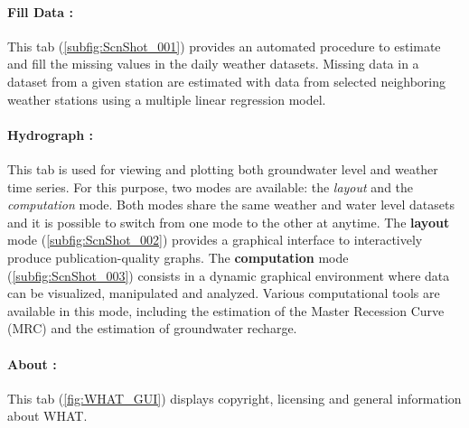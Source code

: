 \documentclass[WHATMANUAL.tex]{subfiles}
\begin{document}
\paragraph{Fill Data :} This tab (\cref{subfig:ScnShot_001}) provides an automated procedure to estimate and fill the missing values in the daily weather datasets. Missing data in a dataset from a given station are estimated with data from selected neighboring weather stations using a multiple linear regression model.

\paragraph{Hydrograph :} This tab is used for viewing and plotting both groundwater level and weather time series. For this purpose, two modes are available: the \emph{layout} and the \emph{computation} mode. Both modes share the same weather and water level datasets and it is possible to switch from one mode to the other at anytime. The \textbf{layout} mode (\cref{subfig:ScnShot_002}) provides a graphical interface to interactively produce publication-quality graphs. The \textbf{computation} mode (\cref{subfig:ScnShot_003}) consists in a dynamic graphical environment where data can be visualized, manipulated and analyzed. Various computational tools are available in this mode, including the estimation of the Master Recession Curve (MRC) and the estimation of groundwater recharge.

\paragraph{About :} This tab (\cref{fig:WHAT_GUI}) displays copyright, licensing and general information about WHAT.
\end{document}
